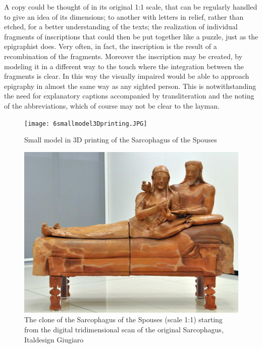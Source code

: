 \documentclass[amsthm,ebook]{saparticle}
\begin{document}
A copy could be thought of in its original 1:1 scale, that can be regularly handled to give an idea of its dimensions;
to another with letters in relief, rather than etched, for a better understanding of the texts; the realization of
individual fragments of inscriptions that could then be put together like a puzzle, just as the epigraphist does. Very
often, in fact, the inscription is the result of a recombination of the fragments. Moreover the inscription may be
created, by modeling it in a different way to the touch where the integration between the fragments is clear. In this
way the visually impaired would be able to approach epigraphy in almost the same way as any sighted person. This is
notwithstanding the need for explanatory captions accompanied by transliteration and the noting of the abbreviations,
which of course may not be clear to the layman.


\begin{figure}[!hbp]
\centering
 \texttt{[image: 6smallmodel3Dprinting.JPG]}
\caption{Small model in 3D printing of the Sarcophagus of the Spouses}
\label{fig:6}
\end{figure}

\begin{figure}[!hbp]
\centering
 \includegraphics[width=\columnwidth]{7CloneSarcophagusoftheSpouses.jpg}
\caption{The clone of the Sarcophagus of the Spouses (scale 1:1) starting from the digital tridimensional scan of the
original Sarcophagus, Italdesign Giugiaro}
\label{fig:7}
\end{figure}
\end{document}
